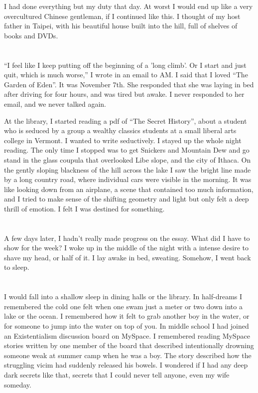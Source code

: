 I had done everything but my duty that day.  At worst I would end up like a very
overcultured Chinese gentleman, if I continued like this.  I thought of my host
father in Taipei, with his beautiful house built into the hill, full of shelves
of books and DVDs.  

\section{}

``I feel like I keep putting off the beginning of a 'long climb'.  Or I start
and just quit, which is much worse,'' I wrote in an email to AM.  I said that I
loved ``The Garden of Eden''.  It was November 7th. She responded that she was
laying in bed after driving for four hours, and was tired but awake.  I never
responded to her email, and we never talked again.

At the library, I started reading a pdf of ``The Secret History'', about a
student who is seduced by a group a wealthy classics students at a small liberal
arts college in Vermont.  I wanted to write seductively.  I stayed up the whole
night reading.  The only time I stopped was to get Snickers and Mountain Dew and
go stand in the glass coupula that overlooked Libe slope, and the city of
Ithaca.  On the gently sloping blackness of the hill across the lake I saw the
bright line made by a long country road, where individual cars were visible in
the morning.  It was like looking down from an airplane, a scene that contained
too much information, and I tried to make sense of the shifting geometry and
light but only felt a deep thrill of emotion.  I felt I was destined for
something.  

\section{}

A few days later, I hadn't really made progress on the essay.  What did I have
to show for the week? I woke up in the middle of the night with a intense desire
to shave my head, or half of it.  I lay awake in bed, sweating.  Somehow, I went
back to sleep.

\section{}

I would fall into a shallow sleep in dining halls or the library.  In
half-dreams I remembered the cold one felt when one swam just a meter or two
down into a lake or the ocean.  I remembered how it felt to grab another boy in
the water, or for someone to jump into the water on top of you.  In middle
school I had joined an Existentialism discussion board on MySpace.  I remembered
reading MySpace stories written by one member of the board that described
intentionally drowning someone weak at summer camp when he was a boy.  The story
described how the struggling vicim had suddenly released his bowels.  I wondered
if I had any deep dark secrets like that, secrets that I could never tell
anyone, even my wife someday.


